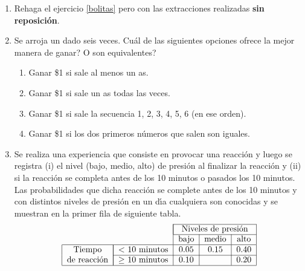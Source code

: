 \documentclass[a4paper, 11pt]{article}
\begin{document}
\begin{enumerate}
\item Rehaga el ejercicio \ref{bolitas} pero con las extracciones realizadas \textbf{sin
reposici\'{o}n}.





\item Se arroja un dado seis veces. \textquestiondown Cu\'{a}l de las
siguientes opciones ofrece la mejor manera de ganar? \textquestiondown O son
equivalentes?\vspace{-0.15cm}


\begin{enumerate}
\item Ganar \$1 si sale al menos un as.


\item Ganar \$1 si sale un as todas las veces.


\item Ganar \$1 si sale la secuencia 1, 2, 3, 4, 5, 6 (en ese orden).


\item Ganar \$1 si los dos primeros n\'{u}meros que salen son iguales.
\end{enumerate}





\item Se realiza una experiencia que consiste en provocar una reacci\'{o}n y
luego  se registra  (i) el nivel (bajo, medio, alto) de presi\'{o}n al finalizar la
reacci\'{o}n y (ii) si la reacci\'{o}n se completa antes de
los 10 minutos o pasados los 10 minutos. Las probabilidades que dicha
reacci\'{o}n se complete antes de los 10 minutos y con distintos niveles de
presi\'{o}n en un d\'{\i}a cualquiera son conocidas y se muestran en la primer fila de 
siguiente tabla.\vspace{-0.1cm}%
\[%
\begin{tabular}
[c]{cc|c|c|c|}\cline{3-5}
&  & \multicolumn{3}{|c|}{Niveles de presi\'{o}n}\\\cline{3-5}
&  & bajo & medio & alto\\\hline
\multicolumn{1}{|c|}{Tiempo } & \multicolumn{1}{|c|}{%
	$<$
	10 minutos} & $0.05$ & $0.15$ & $0.40$\\\cline{2-5}%
\multicolumn{1}{|c|}{de reacci\'{o}n} & \multicolumn{1}{|c|}{$\geq$ 10
	minutos} & $0.10$ &  & $0.20$\\\hline
\end{tabular}
\]





\end{enumerate}
\end{document}
